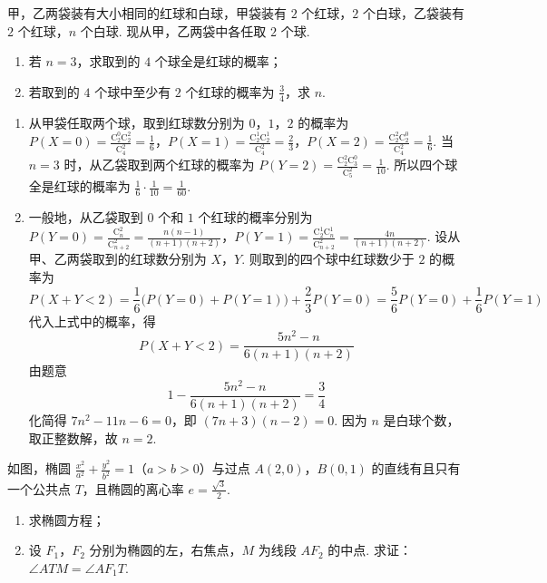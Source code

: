 \begin{problem}
甲，乙两袋装有大小相同的红球和白球，甲袋装有 \(2\) 个红球，\(2\) 个白球，乙袋装有 \(2\) 个红球，\(n\) 个白球. 现从甲，乙两袋中各任取 \(2\) 个球.

\begin{enumerate}
\item 若 \(n = 3\)，求取到的 \(4\) 个球全是红球的概率；
\item 若取到的 \(4\) 个球中至少有 \(2\) 个红球的概率为 \(\frac{3}{4}\)，求 \(n\).
\end{enumerate}
\end{problem}

\begin{solution}
\begin{enumerate}
\item
从甲袋任取两个球，取到红球数分别为 \(0\)，\(1\)，\(2\) 的概率为 \(P(X=0)=\frac{\mathrm C_2^0\mathrm C_2^2}{\mathrm C_4^2}=\frac16\)，\(P(X=1)=\frac{\mathrm C_2^1\mathrm C_2^1}{\mathrm C_4^2}=\frac23\)，\(P(X=2)=\frac{\mathrm C_2^2\mathrm C_2^0}{\mathrm C_4^2}=\frac16\). 当 \(n=3\) 时，从乙袋取到两个红球的概率为 \(P(Y=2)=\frac{\mathrm C_2^2\mathrm C_3^0}{\mathrm C_5^2}=\frac1{10}\).
所以四个球全是红球的概率为 \(\frac16\cdot\frac1{10}=\frac1{60}\).

\item
一般地，从乙袋取到 \(0\) 个和 \(1\) 个红球的概率分别为 \(P(Y=0)=\frac{\mathrm C_n^2}{\mathrm C_{n+2}^2}=\frac{n(n-1)}{(n+1)(n+2)}\)，\(P(Y=1)=\frac{\mathrm C_2^1\mathrm C_n^1}{\mathrm C_{n+2}^2}=\frac{4n}{(n+1)(n+2)}\).
设从甲、乙两袋取到的红球数分别为 \(X\)，\(Y\). 则取到的四个球中红球数少于 \(2\) 的概率为
\[
P(X+Y<2)=\frac16\bigl(P(Y=0)+P(Y=1)\bigr)+\frac23P(Y=0)
=\frac56P(Y=0)+\frac16P(Y=1)
\]
代入上式中的概率，得
\[
P(X+Y<2)=\frac{5n^2-n}{6(n+1)(n+2)}
\]
由题意
\[
1-\frac{5n^2-n}{6(n+1)(n+2)}=\frac34
\]
化简得 \(7n^2-11n-6=0\)，即 \((7n+3)(n-2)=0\).
因为 \(n\) 是白球个数，取正整数解，故 \(n=2\).
\end{enumerate}
\end{solution}

\begin{problem}
如图，椭圆 \(\frac{x^2}{a^2} + \frac{y^2}{b^2} = 1\)（\(a > b > 0\)）与过点 \(A(2,0)\)，\(B(0,1)\) 的直线有且只有一个公共点 \(T\)，且椭圆的离心率 \(e = \frac{\sqrt{3}}{2}\).

\begin{enumerate}
\item 求椭圆方程；
\item 设 \(F_{1}\)，\(F_{2}\) 分别为椭圆的左，右焦点，\(M\) 为线段 \(AF_{2}\) 的中点. 求证：\(\angle ATM = \angle AF_{1}T\).
\end{enumerate}

\end{problem}

